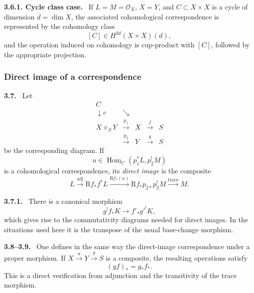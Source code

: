 \documentclass[12pt]{article}
\newcommand{\Hom}{\operatorname{Hom}}
\newcommand{\R}{\mathrm R}
\newcommand{\cO}{\mathcal O}
\newenvironment{statement}[1]{\par\medskip\noindent\textbf{#1.}\ }{\par\medskip}
\begin{document}
\begin{statement}{3.6.1. Cycle class case}
If $L=M=\cO_X$, $X=Y$, and $C\subset X\times X$ is a cycle of dimension $d=\dim X$, the associated cohomological correspondence is represented by the cohomology class
\[
   [C]\in H^{2d}(X\times X)(d),
\]
and the operation induced on cohomology is cup-product with $[C]$, followed by the appropriate projection.
\end{statement}

\subsubsection*{Direct image of a correspondence}

\begin{statement}{3.7}
Let
\[
\begin{array}{ccccc}
C & & & & \\
\downarrow c & \searrow & & & \\
X\times_S Y & \xrightarrow{p_1} & X & \xrightarrow{f} & S \\
& \xrightarrow{p_2} & Y & \xrightarrow{g} & S
\end{array}
\]
be the corresponding diagram. If
\[
   u\in \Hom_C(p_1^*L,p_2^!M)
\]
is a cohomological correspondence, its \emph{direct image} is the composite
\begin{equation}
   L\xrightarrow{\mathrm{adj}} \R f_*f^*L
    \xrightarrow{\R f_*(u)} \R f_*p_{2*}p_2^!M
    \xrightarrow{\mathrm{trace}} M .
   \tag{3.7.1}
\end{equation}
\end{statement}

\begin{statement}{3.7.1}
There is a canonical morphism
\begin{equation}
   g^!f_*K\longrightarrow f'_*g'^!K,
   \tag{3.7.2}
\end{equation}
which gives rise to the commutativity diagrams needed for direct images. In the situations used here it is the transpose of the usual base-change morphism.
\end{statement}

\begin{statement}{3.8--3.9}
One defines in the same way the direct-image correspondence under a proper morphism. If $X\xrightarrow{u}Y\xrightarrow{g}S$ is a composite, the resulting operations satisfy
\[
   (g f)_*=g_*f_*.
\]
This is a direct verification from adjunction and the transitivity of the trace morphism.
\end{statement}
\end{document}
